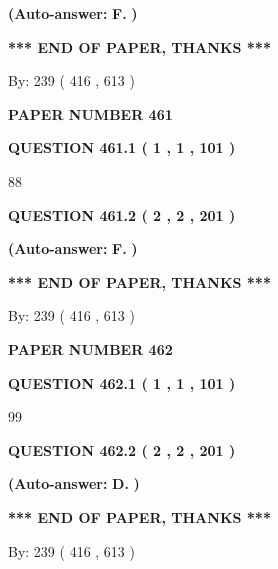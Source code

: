 \documentclass[12pt]{article}
\begin{document}
 
{\textbf{(Auto-answer:}}
{\textbf{\large{
F.}}}
{\textbf{)}}
 
 
   
   
   
   
\vspace{1.0in} 
{\textbf{\large{ *** END OF PAPER, THANKS *** }}} 
   
   
\hspace{1.0in} By: 
 239 ( 416 ,  613 )
   
   
   
   
\newpage 
\setcounter{page}{ 
   461001 } 
   
   
 {\textbf{ \Large{ PAPER NUMBER  461  }}}
   
   
   
   
  
  
{\textbf{\large{QUESTION
461.1 
 ( 1 , 1 , 101 )
}}}

88
  
  
{\textbf{\large{QUESTION
461.2 
 ( 2 , 2 , 201 )
}}}
 
 
{\textbf{(Auto-answer:}}
{\textbf{\large{
F.}}}
{\textbf{)}}
 
 
   
   
   
   
\vspace{1.0in} 
{\textbf{\large{ *** END OF PAPER, THANKS *** }}} 
   
   
\hspace{1.0in} By: 
 239 ( 416 ,  613 )
   
   
   
   
\newpage 
\setcounter{page}{ 
   462001 } 
   
   
 {\textbf{ \Large{ PAPER NUMBER  462  }}}
   
   
   
   
  
  
{\textbf{\large{QUESTION
462.1 
 ( 1 , 1 , 101 )
}}}

99
  
  
{\textbf{\large{QUESTION
462.2 
 ( 2 , 2 , 201 )
}}}
 
 
{\textbf{(Auto-answer:}}
{\textbf{\large{
D.}}}
{\textbf{)}}
 
 
   
   
   
   
\vspace{1.0in} 
{\textbf{\large{ *** END OF PAPER, THANKS *** }}} 
   
   
\hspace{1.0in} By: 
 239 ( 416 ,  613 )
   
   
   
\end{document}
